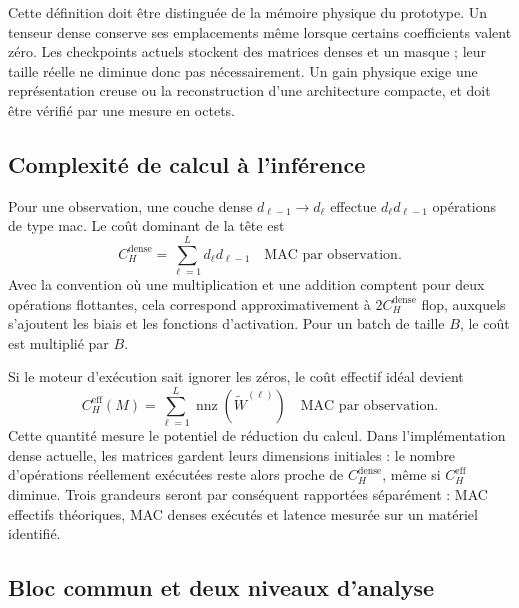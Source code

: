 Cette définition doit être distinguée de la mémoire physique du prototype.
Un tenseur dense conserve ses emplacements même lorsque certains coefficients
valent zéro. Les checkpoints actuels stockent des matrices denses et un masque ;
leur taille réelle ne diminue donc pas nécessairement. Un gain physique exige
une représentation creuse ou la reconstruction d'une architecture compacte,
et doit être vérifié par une mesure en octets.

\subsection{Complexité de calcul à l'inférence}
\label{ssec:probleme_calcul}

Pour une observation, une couche dense
$d_{\ell-1}\rightarrow d_{\ell}$ effectue
$d_{\ell}d_{\ell-1}$ opérations de type \gls{mac}. Le coût dominant de la tête est
\begin{equation}
    C_H^{\mathrm{dense}}
    =\sum_{\ell=1}^{L}d_{\ell}d_{\ell-1}
    \quad\text{MAC par observation}.
    \label{eq:mac_denses}
\end{equation}
Avec la convention où une multiplication et une addition comptent pour deux
opérations flottantes, cela correspond approximativement à
$2C_H^{\mathrm{dense}}$ \gls{flop}, auxquels s'ajoutent les biais et les fonctions
d'activation. Pour un batch de taille $B$, le coût est multiplié par $B$.

Si le moteur d'exécution sait ignorer les zéros, le coût effectif idéal devient
\begin{equation}
    C_H^{\mathrm{eff}}(M)
    =\sum_{\ell=1}^{L}
      \operatorname{nnz}\!\left(\widetilde{W}^{(\ell)}\right)
    \quad\text{MAC par observation}.
    \label{eq:mac_effectifs}
\end{equation}
Cette quantité mesure le potentiel de réduction du calcul. Dans
l'implémentation dense actuelle, les matrices gardent leurs dimensions
initiales : le nombre d'opérations réellement exécutées reste alors proche de
$C_H^{\mathrm{dense}}$, même si $C_H^{\mathrm{eff}}$ diminue. Trois grandeurs
seront par conséquent rapportées séparément : MAC effectifs théoriques, MAC
denses exécutés et latence mesurée sur un matériel identifié.

\subsection{Bloc commun et deux niveaux d'analyse}
\label{ssec:probleme_bloc_commun}

